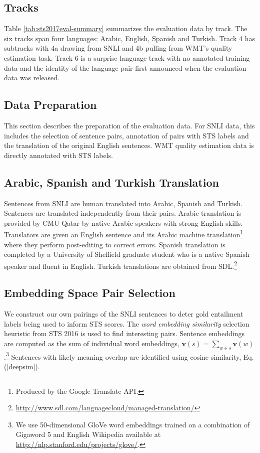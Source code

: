 \documentclass[11pt,a4paper]{article}
\begin{document}
\subsection{Tracks}
Table \ref{tab:sts2017eval-summary} summarizes the evaluation data by track. The six tracks span four languages: Arabic, English, Spanish and Turkish. 
Track 4 has subtracks with 4a drawing from SNLI and 4b pulling from WMT's quality estimation task. Track 6 is a surprise language track with no annotated training data and the identity of the language pair first announced when the evaluation data was released.

\subsection{Data Preparation}\label{sec:data-collection}

This section describes the preparation of the evaluation data. For SNLI data, this includes the selection of sentence pairs, annotation of pairs with STS labels and the translation of the original English sentences. WMT quality estimation data is directly annotated with STS labels.

\subsection{Arabic, Spanish and Turkish Translation}\label{sec:data-translation}

 Sentences from SNLI are human translated into Arabic, Spanish and Turkish. Sentences are translated independently from their pairs. Arabic translation is provided by CMU-Qatar by native Arabic speakers with strong English skills. Translators are given an English sentence and its Arabic machine translation\footnote{Produced by the Google Translate API.} where they perform post-editing to correct errors. Spanish translation is completed by a University of Sheffield graduate student who is a native Spanish speaker and fluent in English. Turkish translations are obtained from SDL.\footnote{\url{http://www.sdl.com/languagecloud/managed-translation/}} 
 
\subsection{Embedding Space Pair Selection} \label{embeddingspacepairselection}

We construct our own pairings of the SNLI sentences to deter gold entailment labels being used to inform STS scores. The {\it word embedding similarity} selection heuristic from STS 2016 \cite{agirre-EtAl:2016:SemEval1} is used to find interesting pairs. Sentence embeddings are computed as the sum of individual word embeddings, $\mathbf{v}(s) = \sum_{w \in s} \mathbf{v} (w)$.\footnote{We use 50-dimensional GloVe word embeddings \cite{pennington2014glove} trained on a combination of Gigaword 5 \cite{parker-EtAl:2011} and English Wikipedia available at \url{http://nlp.stanford.edu/projects/glove/}.} Sentences with likely meaning overlap are identified using cosine similarity, Eq. (\ref{deepsim}).
\end{document}
